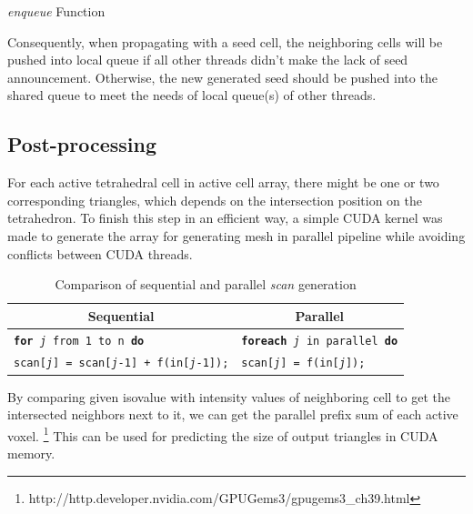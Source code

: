\documentclass[11pt, b5paper]{report}
\begin{document}
\begin{algorithm}[htb]
  \caption[Enqueue function]{\emph{enqueue} Function\label{alg:enqueue}}
  \SetLine
\end{algorithm}

Consequently, when propagating with a seed cell, the neighboring cells will 
be pushed into local queue if all other threads didn't make the lack of seed
announcement. Otherwise, the new generated seed should be pushed into the
shared queue to meet the needs of local queue(s) of other threads.

\subsection{Post-processing}

For each active tetrahedral cell in active cell array, there might be one or
two corresponding triangles, which depends on the intersection position on the
tetrahedron. To finish this step in an efficient way, a simple CUDA kernel was 
made to generate the array for generating mesh in parallel pipeline while 
avoiding conflicts between CUDA threads.

\begin{table}[htb]
  \centering
  \begin{tabular}{p{}|p{}}
    \hline
    \multicolumn{1}{c}{Sequential} & \multicolumn{1}{c}{Parallel} \\
    \hline
    \texttt{\textbf{for} \textit{j} from 1 to n \textbf{do}} & 
    \texttt{\textbf{foreach} \textit{j} in parallel \textbf{do}} \\
    \hspace{10pt} \texttt{scan[\textit{j}] = scan[\textit{j}-1] + f(in[\textit{j}-1]);} & 
    \hspace{10pt} \texttt{scan[\textit{j}] = f(in[\textit{j}]);} \\
    \hline
  \end{tabular}
  \caption{Comparison of sequential and parallel \emph{scan} generation}
  \label{tab:scan}
\end{table}

By comparing given isovalue with intensity values of neighboring cell to get the 
intersected neighbors next to it, we can get the parallel prefix sum 
\cite{harris2007parallel} of each active voxel.
\footnote{http://http.developer.nvidia.com/GPUGems3/gpugems3\_ch39.html} 
This can be used for predicting the size of output triangles in CUDA memory.
\end{document}
